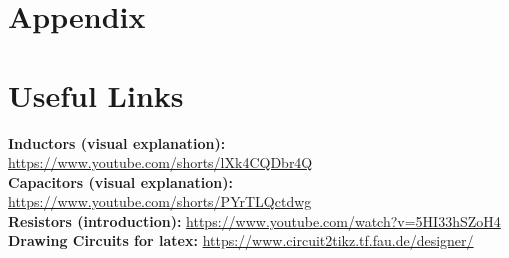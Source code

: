 \documentclass{article}
\begin{document}
\section{Appendix}

\section{Useful Links}
\noindent\textbf{Inductors (visual explanation):} \url{https://www.youtube.com/shorts/lXk4CQDbr4Q}\\
\textbf{Capacitors (visual explanation):} \url{https://www.youtube.com/shorts/PYrTLQctdwg}\\
\textbf{Resistors (introduction):} \url{https://www.youtube.com/watch?v=5HI33hSZoH4}
\textbf{Drawing Circuits for latex:} \url{https://www.circuit2tikz.tf.fau.de/designer/}
\end{document}
